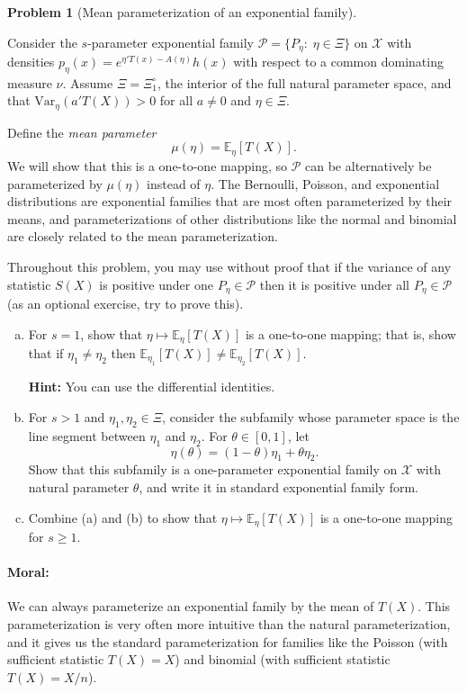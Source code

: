 \documentclass{article}
\newcommand{\cP}{\mathcal{P}}
\newcommand{\cX}{\mathcal{X}}
\newcommand{\EE}{\mathbb{E}}
\theoremstyle{definition}
\newtheorem{problem}{Problem}
\begin{document}
\begin{problem}[Mean parameterization of an exponential family]
\label{prob:mean-param}

  Consider the $s$-parameter exponential family $\cP = \{P_\eta:\; \eta \in \Xi\}$ on $\cX$ with densities $p_\eta(x) = e^{\eta'T(x) - A(\eta)}h(x)$ with respect to a common dominating measure $\nu$. Assume $\Xi=\Xi_1^{\circ}$, the interior of the full natural parameter space, and that $\text{Var}_\eta(a'T(X))>0$ for all $a \neq 0$ and $\eta\in \Xi$.

  Define the {\em mean parameter} 
  \[
  \mu(\eta) = \EE_\eta[T(X)].
  \]
  We will show that this is a one-to-one mapping, so $\cP$ can be alternatively be parameterized by $\mu(\eta)$ instead of $\eta$. The Bernoulli, Poisson, and exponential distributions are exponential families that are most often parameterized by their means, and parameterizations of other distributions like the normal and binomial are closely related to the mean parameterization.

  Throughout this problem, you may use without proof that if the variance of any statistic $S(X)$ is positive under one $P_\eta \in \cP$ then it is positive under all $P_\eta \in \cP$ (as an optional exercise, try to prove this).

  \begin{enumerate}[(a)]
    
  \item For $s=1$, show that $\eta \mapsto \EE_\eta[T(X)]$ is a one-to-one mapping; that is, show that if $\eta_1 \neq \eta_2$ then $\EE_{\eta_1}[T(X)] \neq \EE_{\eta_2}[T(X)]$.

    {\bf Hint:} You can use the differential identities.

    

  \item For $s>1$ and $\eta_1,\eta_2\in\Xi$, consider the subfamily whose parameter space is the line segment between $\eta_1$ and $\eta_2$. For $\theta \in [0,1]$, let
    \[
    \eta(\theta) = (1-\theta) \eta_1 + \theta \eta_2. 
    \]
    Show that this subfamily is a one-parameter exponential family on $\cX$ with natural parameter $\theta$, and write it in standard exponential family form.

    

  \item Combine (a) and (b) to show that $\eta \mapsto \EE_\eta[T(X)]$ is a one-to-one mapping for $s \geq 1$.

    


  \end{enumerate}

\paragraph{Moral:} We can always parameterize an exponential family by the mean of $T(X)$. This parameterization is very often more intuitive than the natural parameterization, and it gives us the standard parameterization for families like the Poisson (with sufficient statistic $T(X)=X$) and binomial (with sufficient statistic $T(X)=X/n$).
\end{problem}
\end{document}
